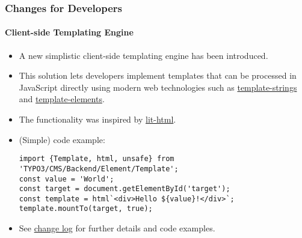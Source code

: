 %

\begin{frame}[fragile]
	\frametitle{Changes for Developers}
	\framesubtitle{Client-side Templating Engine}

	\lstset{basicstyle=\tiny\ttfamily}

	\begin{itemize}
		\item A new simplistic client-side templating engine has been introduced.
		\item This solution lets developers implement templates that can be processed
			in JavaScript directly using modern web technologies such as
			\href{https://developer.mozilla.org/en-US/docs/Web/JavaScript/Reference/Template\_literals}{template-strings}
			and
			\href{https://developer.mozilla.org/en-US/docs/Web/HTML/Element/template}{template-elements}.
		\item The functionality was inspired by \href{https://lit-html.polymer-project.org/}{lit-html}.
		\item (Simple) code example:
\begin{lstlisting}
import {Template, html, unsafe} from 'TYPO3/CMS/Backend/Element/Template';
const value = 'World';
const target = document.getElementById('target');
const template = html`<div>Hello ${value}!</div>`;
template.mountTo(target, true);
\end{lstlisting}
		\item See
			\href{https://docs.typo3.org/c/typo3/cms-core/master/en-us/Changelog/master/Feature-91810-IntroduceClient-sideTemplatingEngine.html}{change log}
			for further details and code examples.

	\end{itemize}
\end{frame}

